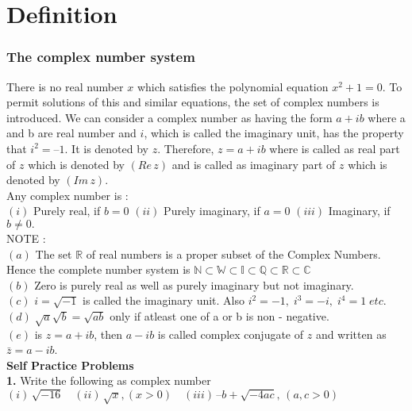 \documentclass[a4paper,10.5pt,fleqn]{article}
\begin{document}
\section{Definition}
\subsubsection{ The complex number system}
There is no real number $ x $ which satisfies the polynomial equation $x^2+ 1 = 0.$ To permit solutions of this and similar equations, the set of complex numbers is introduced. We can consider a complex number as having the form $a + ib$ where a and b are real number and $ i $,
which is called the imaginary unit, has the property that $ i^2= – 1.$
It is denoted by $ z $. Therefore,  $z = a + ib$ where  is called as real part of $ z $ which is denoted by $ (Re\, z) $ and  is called as imaginary part of $ z $ which is denoted by $(Im\,z).$\\

Any complex number is :\\

$ (i) $ Purely real, if $b = 0$  \quad $ (ii)$ Purely imaginary, if $a = 0$ \quad $(iii)$ Imaginary, if $ b \neq 0.$\\

NOTE :\\ 

$(a)$ The set $\mathbb{R}$ of real numbers is a proper subset of the Complex Numbers. Hence the complete
number system is $\mathbb{N} \subset \mathbb{W} \subset \mathbb{I} \subset \mathbb{Q} \subset \mathbb{R} \subset \mathbb{C}$\\

$(b)$ Zero is purely real as well as purely imaginary but not imaginary.\\

$(c)$ $ i = \sqrt{-1}$ is called the imaginary unit. Also $i^2 = -1,\; i^3= -i ,\; i^4= 1\; etc.$\\

$(d)\; \sqrt{a} \sqrt{b} = \sqrt{ab} $ only if atleast one of a or b is non - negative.\\

$(e)$ is $z = a + ib$, then $a - ib$ is called complex conjugate of $z$ and written as $ \bar{z} = a -ib$.\\

\textbf{Self Practice Problems}\\

\textbf{1. }Write the following as complex number
$(i)\, \sqrt{-16} \quad (ii)\, \sqrt{x} , (x > 0)\quad
(iii)\, –b + \sqrt{-4ac},\, (a, c> 0)$\\
\end{document}
